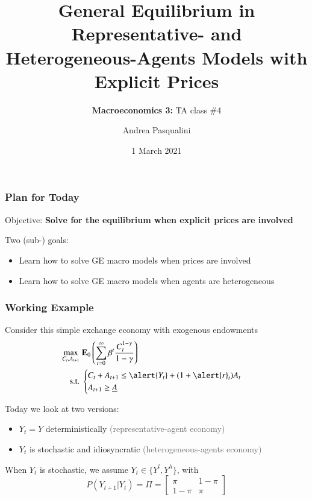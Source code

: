 \documentclass[10pt, aspectratio=1610, natbib, handout]{beamer}
\title[GE with Prices]{
  \textbf{General Equilibrium in Representative- and Heterogeneous-Agents Models with Explicit Prices}
}
\subtitle[Macro 3: TA\#4]{
  \textbf{Macroeconomics 3:} TA class \#4
}
\author[A.~Pasqualini]{
  Andrea Pasqualini
}
\institute[Bocconi]{Bocconi University}
\date{
  1 March 2021
}
\newcommand{\dimmer}[1]{\textcolor{dimgray}{#1}}
\newcommand{\E}{\mathbf{E}}
\begin{document}
  \begin{frame}
    \maketitle
  \end{frame}

  \begin{frame}
    \frametitle{Plan for Today}

    Objective: \textbf{Solve for the equilibrium when explicit prices are involved}

    \vfill\pause

    Two (sub-) goals:
    \begin{itemize}
      \item Learn how to solve GE macro models when prices are involved
      \item Learn how to solve GE macro models when agents are heterogeneous
    \end{itemize}

  \end{frame}

  \begin{frame}
    \frametitle{Working Example}

    Consider this simple exchange economy with exogenous endowments
    \begin{align*}
      \max_{C_t, A_{t+1}} &\; \E_0 \left( \sum_{t=0}^{\infty} \beta^t \frac{C_t^{1-\gamma}}{1-\gamma} \right) \\
      \text{s.t.} &\;
      \begin{cases}
        C_t + A_{t+1} \leq \alert{Y_t} + (1 + \alert{r}_t) A_t \\
        A_{t+1} \geq \underline{A}
      \end{cases}
    \end{align*}

    \vfill\pause

    Today we look at two versions:
    \begin{itemize}
      \item $Y_t = Y$ deterministically \hfill\dimmer{(representative-agent economy)}
      \item $Y_t$ is stochastic and idiosyncratic \hfill\dimmer{(heterogeneous-agents economy)}
    \end{itemize}

    \vfill\pause

    When $Y_t$ is stochastic, we assume $Y_t \in \{ Y^l, Y^h \}$, with
    \begin{equation*}
      P(Y_{t+1} | Y_t) = \Pi =
      \begin{bmatrix}
        \pi & 1 - \pi \\
        1 - \pi & \pi
      \end{bmatrix}
    \end{equation*}

  \end{frame}
\end{document}
